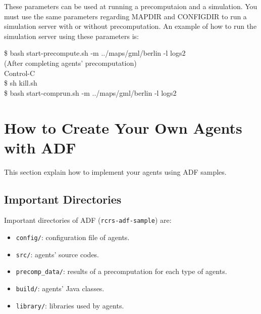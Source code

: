\documentclass{article}
\begin{document}
These parameters can be used at running a precomputaion and a simulation. You must use the same parameters regarding MAPDIR and CONFIGDIR to run a simulation server with or without precomputation. An example of how to run the simulation server using these parameters is:
\begin{center}
   \begin{tcolorbox}[title=Running Simulation Server with Options, width=.98\linewidth]
    {\ttfamily
    \$ bash start-precompute.sh -m ../maps/gml/berlin -l logs2\\
    (After completing agents' precomputation)\\
    Control-C\\
    \$ sh kill.sh\\
    \$ bash start-comprun.sh -m ../maps/gml/berlin -l logs2
    }
  \end{tcolorbox}
\end{center}
\section{How to Create Your Own Agents with ADF}
This section explain how to implement your agents using ADF samples.
\subsection{Important Directories}
Important directories of ADF (\texttt{rcrs-adf-sample}) are:
\begin{itemize}
 \item \texttt{config/}: configuration file of agents.
 \item \texttt{src/}: agents' source codes.
 \item \texttt{precomp\_data/}: results of a precomputation for each type of agents.
 \item \texttt{build/}: agents' Java classes.
 \item \texttt{library/}: libraries used by agents.
\end{itemize}
\end{document}

